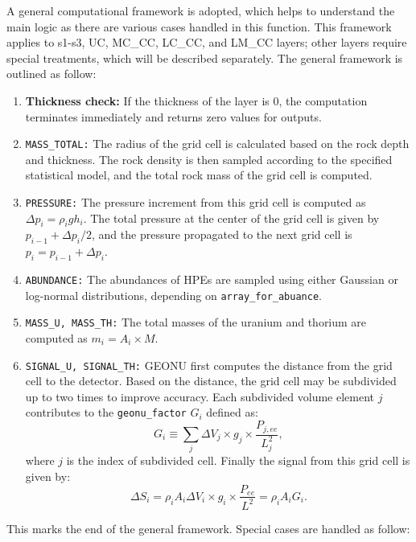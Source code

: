 			A general computational framework is adopted, which helps to understand the main logic as there are various cases handled in this function. This framework applies to s1-s3, UC, MC\_CC, LC\_CC, and LM\_CC layers; other layers require special treatments, which will be described separately. The general framework is outlined as follow:
				\begin{enumerate}
					\item \textbf{Thickness check:} If the thickness of the layer is $0$, the computation terminates immediately and returns zero values for outputs.
					\item \texttt{MASS\_TOTAL:} The radius of the grid cell is calculated based on the rock depth and thickness. The rock density is then sampled according to the specified statistical model, and the total rock mass of the grid cell is computed.
					\item \texttt{PRESSURE:} The pressure increment from this grid cell is computed as $\Delta p_i = \rho_i g h_i$. The total pressure at the center of the grid cell is given by $p_{i - 1} + \Delta p_i/2$, and the pressure propagated to the next grid cell is $p_i = p_{i - 1} + \Delta p_i$.
					\item \texttt{ABUNDANCE:} The abundances of HPEs are sampled using either Gaussian or log-normal distributions, depending on \texttt{array\_for\_abuance}.
					\item \texttt{MASS\_U, MASS\_TH:} The total masses of the uranium and thorium are computed as $m_i = A_i \times M$.
					\item \texttt{SIGNAL\_U, SIGNAL\_TH:} GEONU first computes the distance from the grid cell to the detector. Based on the distance, the grid cell may be subdivided up to two times to improve accuracy. Each subdivided volume element $j$ contributes to the \texttt{geonu\_factor} $G_i$ defined as:
						\begin{equation}
							G_i
							\equiv \sum_j \Delta V_j \times g_j \times \frac{P_{j, ee}}{L_j^2},
						\end{equation}
					where $j$ is the index of subdivided cell. Finally the signal from this grid cell is given by:
						\begin{equation}
							\Delta S_i
							= \rho_i A_i \Delta V_i \times g_i \times \frac{P_{ee}}{L^2}
							= \rho_i A_i G_i.
						\end{equation}
				\end{enumerate}
			This marks the end of the general framework. Special cases are handled as follow:
